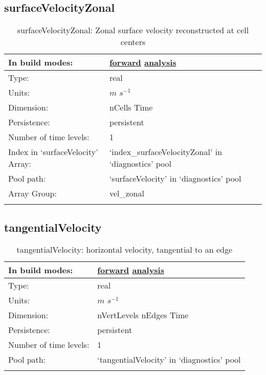 \subsection[surfaceVelocityZonal]{surfaceVelocityZonal}
\label{subsec:var_sec_diagnostics_surfaceVelocityZonal}
\begin{center}
\begin{longtable}{| p{2.0in} | p{4.0in} |}
        \hline 
        In build modes: & \hyperref[subsec:forward_var_tab_diagnostics]{forward} \hyperref[subsec:analysis_var_tab_diagnostics]{analysis} \\
        \hline 
        Type: & real \\
        \hline 
        Units: & $m$ $s^{-1}$ \\
        \hline 
        Dimension: & nCells Time \\
        \hline 
        Persistence: & persistent \\
        \hline 
        Number of time levels: & 1 \\
        \hline 
		 Index in `surfaceVelocity' Array: & `index\_surfaceVelocityZonal' in `diagnostics' pool \\
		 \hline 
            Pool path: & `surfaceVelocity' in `diagnostics' pool \\
		 \hline 
		 Array Group: & vel\_zonal \\
		 \hline 
    \caption{surfaceVelocityZonal: Zonal surface velocity reconstructed at cell centers}
\end{longtable}
\end{center}
\subsection[tangentialVelocity]{tangentialVelocity}
\label{subsec:var_sec_diagnostics_tangentialVelocity}
\begin{center}
\begin{longtable}{| p{2.0in} | p{4.0in} |}
        \hline 
        In build modes: & \hyperref[subsec:forward_var_tab_diagnostics]{forward} \hyperref[subsec:analysis_var_tab_diagnostics]{analysis} \\
        \hline 
        Type: & real \\
        \hline 
        Units: & $m$ $s^{-1}$ \\
        \hline 
        Dimension: & nVertLevels nEdges Time \\
        \hline 
        Persistence: & persistent \\
        \hline 
        Number of time levels: & 1 \\
        \hline 
            Pool path: & `tangentialVelocity' in `diagnostics' pool \\
		 \hline 
    \caption{tangentialVelocity: horizontal velocity, tangential to an edge}
\end{longtable}
\end{center}
